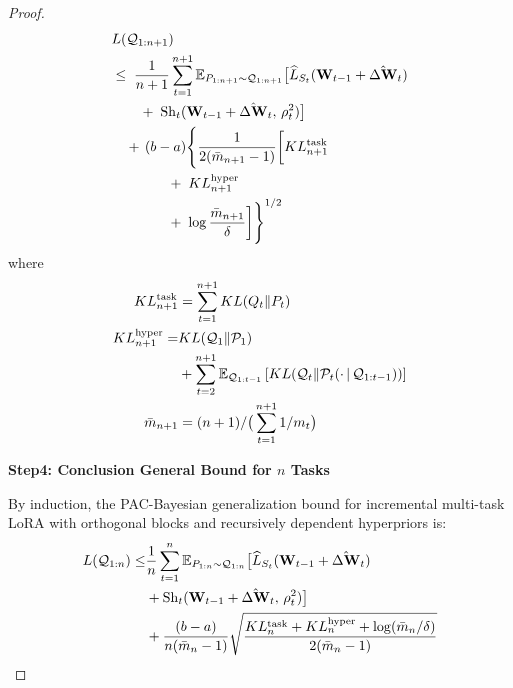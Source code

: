 \documentclass[letterpaper]{article} %
\begin{document}
\begin{proof}
\begin{align}
& L(\mathcal{Q}_{1:n+1})  \\
&\leq\; \frac{1}{n+1} \sum_{t=1}^{n+1}
    \mathbb{E}_{P_{1:n+1} \sim \mathcal{Q}_{1:n+1}}\big[
        \widehat{L}_{S_t}(\mathbf{W}_{t-1} + \hat{\Delta\mathbf{W}}_t) \notag \\
&\qquad
    +\; \mathrm{Sh}_t(\mathbf{W}_{t-1} + \hat{\Delta\mathbf{W}}_t,\, \rho_t^2)
    \big] \notag \\
&\quad
    +\, (b-a) \Bigg\{
        \frac{1}{2(\bar{m}_{n+1} - 1)} \bigg[
            KL_{n+1}^{\text{task}} \notag \\
&\qquad\qquad
            +\; KL_{n+1}^{\text{hyper}} \notag \\
&\qquad\qquad
            +\; \log\frac{\bar{m}_{n+1}}{\delta}
        \bigg]
    \Bigg\}^{1/2}
\end{align}
where
    \begin{equation}
        \begin{aligned}
        KL_{n+1}^{\text{task}} &= \sum_{t=1}^{n+1} KL(Q_t\|P_t)\\
        KL_{n+1}^{\text{hyper}} = & KL(\mathcal{Q}_1\|\mathcal{P}_1)  \\
        &+\sum_{t=2}^{n+1} \mathbb{E}_{\mathcal{Q}_{1:t-1}}
        \left[ KL(\mathcal{Q}_t \| \mathcal{P}_t(\cdot\,|\,\mathcal{Q}_{1:t-1})) \right] \\
        \bar{m}_{n+1} &= (n+1)/\big(\sum_{t=1}^{n+1} 1/m_t\big) \notag
    \end{aligned}
    \end{equation}

\textbf{Step4: Conclusion General Bound for $n$ Tasks}

By induction, the PAC-Bayesian generalization bound for incremental multi-task LoRA with orthogonal blocks and recursively dependent hyperpriors is:
\begin{align}
        L(\mathcal{Q}_{1:n}) \leq & \frac{1}{n} \sum_{t=1}^{n}
        \mathbb{E}_{P_{1:n} \sim \mathcal{Q}_{1:n}}\big[
            \widehat{L}_{S_t}(\mathbf{W}_{t-1} + \hat{\Delta\mathbf{W}}_t) \notag\\
        & + \mathrm{Sh}_t(\mathbf{W}_{t-1} + \hat{\Delta\mathbf{W}}_t,\, \rho_t^2)
        \big] \notag\\
        & + \frac{(b-a) }{n(\bar{m}_n - 1)}\sqrt{
            \frac{KL_{n}^{\text{task}} + KL_{n}^{\text{hyper}} +\log(\bar{m}_{n}/\delta)}{2(\bar{m}_{n} - 1)}
        }
    \end{align}


\end{proof}
\end{document}
